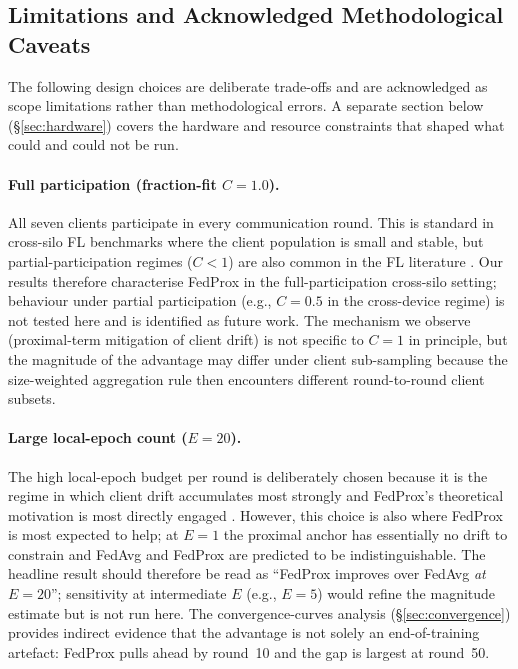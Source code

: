 \documentclass[11pt,a4paper]{article}
\begin{document}
\subsection{Limitations and Acknowledged Methodological Caveats}
The following design choices are deliberate trade-offs and are
acknowledged as scope limitations rather than methodological errors.
A separate section below (§\ref{sec:hardware}) covers the hardware and
resource constraints that shaped what could and could not be run.

\paragraph{Full participation (fraction-fit $C = 1.0$).} All seven
clients participate in every communication round. This is standard in
cross-silo FL benchmarks where the client population is small and
stable, but partial-participation regimes ($C < 1$) are also common in
the FL literature \citep{karimireddy2020scaffold}. Our results
therefore characterise FedProx in the full-participation cross-silo
setting; behaviour under partial participation (e.g., $C = 0.5$ in the
cross-device regime) is not tested here and is identified as future
work. The mechanism we observe (proximal-term mitigation of client
drift) is not specific to $C = 1$ in principle, but the magnitude of
the advantage may differ under client sub-sampling because the
size-weighted aggregation rule then encounters different round-to-round
client subsets.

\paragraph{Large local-epoch count ($E = 20$).} The high local-epoch
budget per round is deliberately chosen because it is the regime in
which client drift accumulates most strongly and FedProx's theoretical
motivation is most directly engaged \citep[Theorem~4]{li2020fedprox}.
However, this choice is also where FedProx is most expected to help; at
$E = 1$ the proximal anchor has essentially no drift to constrain and
FedAvg and FedProx are predicted to be indistinguishable. The headline
result should therefore be read as ``FedProx improves over FedAvg
\emph{at $E = 20$}''; sensitivity at intermediate $E$ (e.g., $E = 5$)
would refine the magnitude estimate but is not run here. The
convergence-curves analysis (§\ref{sec:convergence}) provides indirect
evidence that the advantage is not solely an end-of-training artefact:
FedProx pulls ahead by round~10 and the gap is largest at round~50.
\end{document}
